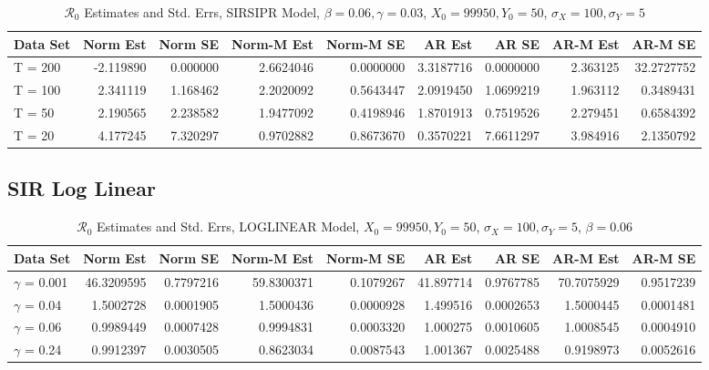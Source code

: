 \message{ !name(draft_v13.tex)}\documentclass[12pt]{article}
\newcommand{\rr}{\ensuremath{\mathcal{R}_0}}
\begin{document}
\begin{table}[H]
	
	\caption{\label{tab:}$\rr$ Estimates and Std. Errs, SIRSIPR Model,
		$\beta = 0.06, \gamma = 0.03$, $X_0 = 99950, Y_0 = 50$, $\sigma_X = 100, \sigma_Y = 5$}
	\centering
	\begin{tabular}[t]{l|r|r|r|r|r|r|r|r}
		\hline
		Data Set & Norm Est & Norm SE & Norm-M Est & Norm-M SE & AR Est & AR SE & AR-M Est & AR-M SE\\
		\hline
		T = 200 & -2.119890 & 0.000000 & 2.6624046 & 0.0000000 & 3.3187716 & 0.0000000 & 2.363125 & 32.2727752\\
		\hline
		T = 100 & 2.341119 & 1.168462 & 2.2020092 & 0.5643447 & 2.0919450 & 1.0699219 & 1.963112 & 0.3489431\\
		\hline
		T = 50 & 2.190565 & 2.238582 & 1.9477092 & 0.4198946 & 1.8701913 & 0.7519526 & 2.279451 & 0.6584392\\
		\hline
		T = 20 & 4.177245 & 7.320297 & 0.9702882 & 0.8673670 & 0.3570221 & 7.6611297 & 3.984916 & 2.1350792\\
		\hline
	\end{tabular}
\end{table}

\subsection{SIR Log Linear}

\begin{table}[H]
	
	\caption{\label{tab:}$\rr$ Estimates and Std. Errs, LOGLINEAR Model,
		$X_0 = 99950, Y_0 = 50$, $\sigma_X = 100, \sigma_Y = 5$, $\beta = 0.06$}
	\centering
	\begin{footnotesize}
		\begin{tabular}[t]{l|r|r|r|r|r|r|r|r}
			\hline
			Data Set & Norm Est & Norm SE & Norm-M Est & Norm-M SE & AR Est & AR SE & AR-M Est & AR-M SE\\
			\hline
			$\gamma$ = 0.001 & 46.3209595 & 0.7797216 & 59.8300371 & 0.1079267 & 41.897714 & 0.9767785 & 70.7075929 & 0.9517239\\
			\hline
			$\gamma$ = 0.04 & 1.5002728 & 0.0001905 & 1.5000436 & 0.0000928 & 1.499516 & 0.0002653 & 1.5000445 & 0.0001481\\
			\hline
			$\gamma$ = 0.06 & 0.9989449 & 0.0007428 & 0.9994831 & 0.0003320 & 1.000275 & 0.0010605 & 1.0008545 & 0.0004910\\
			\hline
			$\gamma$ = 0.24 & 0.9912397 & 0.0030505 & 0.8623034 & 0.0087543 & 1.001367 & 0.0025488 & 0.9198973 & 0.0052616\\
			\hline
		\end{tabular}
	\end{footnotesize}
\end{table}
\end{document}
